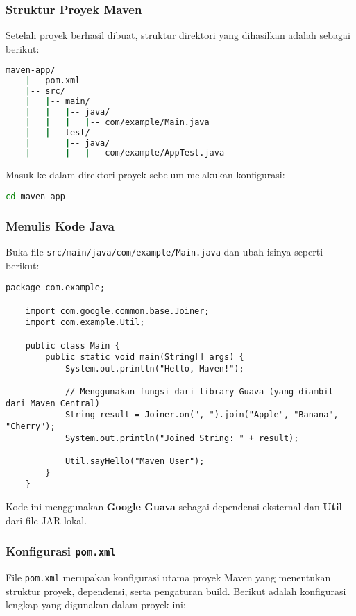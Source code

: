 \subsubsection{Struktur Proyek Maven}

Setelah proyek berhasil dibuat, struktur direktori yang dihasilkan adalah sebagai berikut:

\begin{lstlisting}[language=bash]
	maven-app/
	|-- pom.xml
	|-- src/
	|   |-- main/
	|   |   |-- java/
	|   |   |   |-- com/example/Main.java
	|   |-- test/
	|       |-- java/
	|       |   |-- com/example/AppTest.java
\end{lstlisting}

Masuk ke dalam direktori proyek sebelum melakukan konfigurasi:

\begin{lstlisting}[language=bash]
	cd maven-app
\end{lstlisting}

\subsubsection{Menulis Kode Java}

Buka file \texttt{src/main/java/com/example/Main.java} dan ubah isinya seperti berikut:

\begin{lstlisting}[style=JavaStyle]
	package com.example;
	
	import com.google.common.base.Joiner;
	import com.example.Util;
	
	public class Main {
		public static void main(String[] args) {
			System.out.println("Hello, Maven!");
			
			// Menggunakan fungsi dari library Guava (yang diambil dari Maven Central)
			String result = Joiner.on(", ").join("Apple", "Banana", "Cherry");
			System.out.println("Joined String: " + result);
			
			Util.sayHello("Maven User");
		}
	}
\end{lstlisting}

Kode ini menggunakan \textbf{Google Guava} sebagai dependensi eksternal dan \textbf{Util} dari file JAR lokal.

\subsubsection{Konfigurasi \texttt{pom.xml}}

File \texttt{pom.xml} merupakan konfigurasi utama proyek Maven yang menentukan struktur proyek, dependensi, serta pengaturan build. Berikut adalah konfigurasi lengkap yang digunakan dalam proyek ini:


